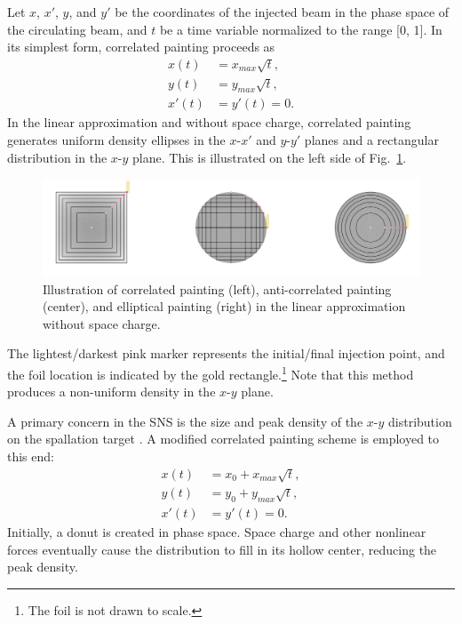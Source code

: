 Let $x$, $x'$, $y$, and $y'$ be the coordinates of the injected beam in the phase space of the circulating beam, and $t$ be a time variable normalized to the range [0, 1]. In its simplest form, correlated painting proceeds as
%
\begin{equation}
\begin{aligned}
    {x}(t) &= {x}_{max}\sqrt{t}, \\
    {y}(t) &= {y}_{max}\sqrt{t}, \\
    x'(t) &= y'(t) = 0.
\end{aligned}
\end{equation}
%
In the linear approximation and without space charge, correlated painting generates uniform density ellipses in the $x$-$x'$ and $y$-$y'$ planes and a rectangular distribution in the $x$-$y$ plane. This is illustrated on the left side of Fig.~\ref{fig:painting_graphic}. 
%
\begin{figure}[!p]
    \centering
    \includegraphics[width=\textwidth]{Images/chapter1/painting_graphic.png}
    \caption{Illustration of correlated painting (left), anti-correlated painting (center), and elliptical painting (right) in the linear approximation without space charge.}
    \label{fig:painting_graphic}
\end{figure}
%
The lightest/darkest pink marker represents the initial/final injection point, and the foil location is indicated by the gold rectangle.\footnote{The foil is not drawn to scale.} Note that this method produces a non-uniform density in the $x$-$y$ plane.

A primary concern in the SNS is the size and peak density of the $x$-$y$ distribution on the spallation target \cite{Riemer2010}. A modified correlated painting scheme is employed to this end:
%
\begin{equation}
\begin{aligned}
    {x}(t) &= x_0 + x_{max}\sqrt{t}, \\
    {y}(t) &= y_0 + y_{max}\sqrt{t}, \\
    x'(t) &= y'(t) = 0.
\end{aligned}
\end{equation}
%
Initially, a donut is created in phase space. Space charge and other nonlinear forces eventually cause the distribution to fill in its hollow center, reducing the peak density.


